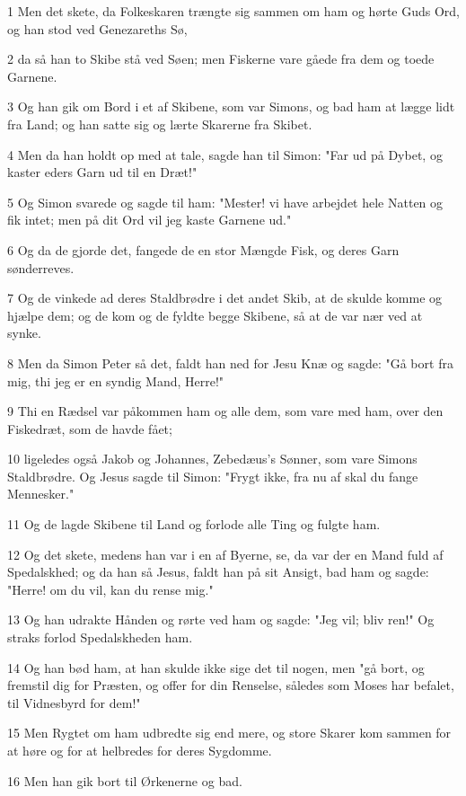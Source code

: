 \par 1 Men det skete, da Folkeskaren trængte sig sammen om ham og hørte Guds Ord, og han stod ved Genezareths Sø,
\par 2 da så han to Skibe stå ved Søen; men Fiskerne vare gåede fra dem og toede Garnene.
\par 3 Og han gik om Bord i et af Skibene, som var Simons, og bad ham at lægge lidt fra Land; og han satte sig og lærte Skarerne fra Skibet.
\par 4 Men da han holdt op med at tale, sagde han til Simon: "Far ud på Dybet, og kaster eders Garn ud til en Dræt!"
\par 5 Og Simon svarede og sagde til ham: "Mester! vi have arbejdet hele Natten og fik intet; men på dit Ord vil jeg kaste Garnene ud."
\par 6 Og da de gjorde det, fangede de en stor Mængde Fisk, og deres Garn sønderreves.
\par 7 Og de vinkede ad deres Staldbrødre i det andet Skib, at de skulde komme og hjælpe dem; og de kom og de fyldte begge Skibene, så at de var nær ved at synke.
\par 8 Men da Simon Peter så det, faldt han ned for Jesu Knæ og sagde: "Gå bort fra mig, thi jeg er en syndig Mand, Herre!"
\par 9 Thi en Rædsel var påkommen ham og alle dem, som vare med ham, over den Fiskedræt, som de havde fået;
\par 10 ligeledes også Jakob og Johannes, Zebedæus's Sønner, som vare Simons Staldbrødre. Og Jesus sagde til Simon: "Frygt ikke, fra nu af skal du fange Mennesker."
\par 11 Og de lagde Skibene til Land og forlode alle Ting og fulgte ham.
\par 12 Og det skete, medens han var i en af Byerne, se, da var der en Mand fuld af Spedalskhed; og da han så Jesus, faldt han på sit Ansigt, bad ham og sagde: "Herre! om du vil, kan du rense mig."
\par 13 Og han udrakte Hånden og rørte ved ham og sagde: "Jeg vil; bliv ren!" Og straks forlod Spedalskheden ham.
\par 14 Og han bød ham, at han skulde ikke sige det til nogen, men "gå bort, og fremstil dig for Præsten, og offer for din Renselse, således som Moses har befalet, til Vidnesbyrd for dem!"
\par 15 Men Rygtet om ham udbredte sig end mere, og store Skarer kom sammen for at høre og for at helbredes for deres Sygdomme.
\par 16 Men han gik bort til Ørkenerne og bad.
